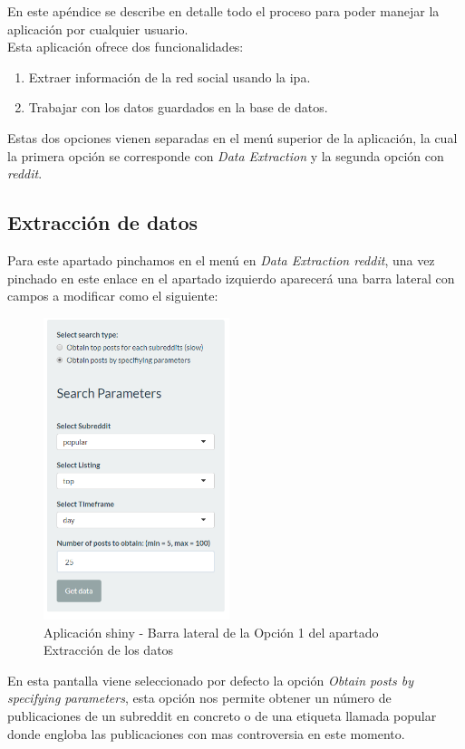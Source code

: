 \documentclass[../../main.tex]{subfiles}
\begin{document}
En este apéndice se describe en detalle todo el proceso para poder manejar la aplicación por cualquier usuario.  \\

Esta aplicación ofrece dos funcionalidades:
\begin{enumerate}
    \item Extraer información de la red social usando la \gls{ipa}.
    \item Trabajar con los datos guardados en la base de datos.
\end{enumerate}

Estas dos opciones vienen separadas en el menú superior de la aplicación, la cual la primera opción se corresponde con \textit{Data Extraction} y la segunda opción con \textit{\Gls{reddit}}.

\subsection{Extracción de datos}

Para este apartado pinchamos en el menú en \textit{Data Extraction \textrightarrow  \Gls{reddit}}, una vez pinchado en este enlace en el apartado izquierdo aparecerá una barra lateral con campos a modificar como el siguiente:

\begin{figure}[H]
\centering
\includegraphics[height=250pt]{images/apendices/data-extract1.1.png}
\caption{Aplicación \Gls{shiny} - Barra lateral de la Opción 1 del apartado Extracción de los datos}
\end{figure}

En esta pantalla viene seleccionado por defecto la opción \textit{Obtain posts by specifying parameters}, esta opción nos permite obtener un número de publicaciones de un \gls{subreddit} en concreto o de una etiqueta llamada popular donde engloba las publicaciones con mas controversia en este momento.
\end{document}
